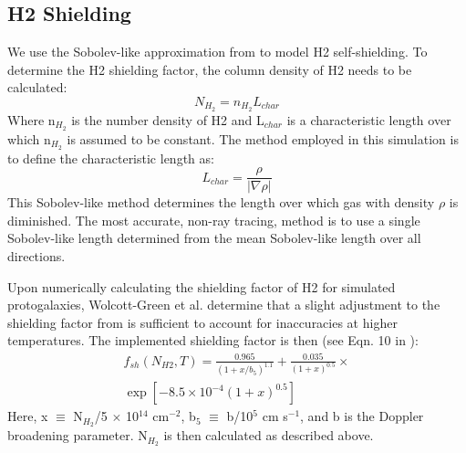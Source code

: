 \documentclass[a4paper,fleqn,usenatbib]{mnras}
\begin{document}
\subsection{H2 Shielding}
We use the Sobolev-like approximation from \citet{Wolcott11} to model H2 self-shielding. To determine the H2 shielding factor, the column density of H2 needs to be calculated:
\begin{equation}
	N_{H_{2}} = n_{H_{2}}L_{char}
\end{equation}
Where n$_{H_{2}}$ is the number density of H2 and L$_{char}$ is a characteristic length over which n$_{H_{2}}$ is assumed to be constant. The method employed in this simulation is to define the characteristic length as:
\begin{equation}
	L_{char} = \frac{\rho}{|\nabla \rho|}
\end{equation}
This Sobolev-like method determines the length over which gas with density $\rho$ is diminished. The most accurate, non-ray tracing, method is to use a single Sobolev-like length determined from the mean Sobolev-like length over all directions. 

Upon numerically calculating the shielding factor of H2 for simulated protogalaxies, Wolcott-Green et al. determine that a slight adjustment to the shielding factor from \citet{Draine96} is sufficient to account for inaccuracies at higher temperatures. The implemented shielding factor is then (see Eqn. 10 in \citet{Wolcott11}):
\begin{equation}
	\begin{multlined}
	f_{sh}(N_{H2}, T) = \frac{0.965}{(1+x/b_{5})^{1.1}} + \frac{0.035}{(1+x)^{0.5}}  \times \\ \exp [-8.5 \times 10^{-4} (1+x)^{0.5}]
	\end{multlined}
\end{equation}
Here, x $\equiv$ N$_{H_{2}}$/5 $\times$ 10$^{14}$ cm$^{-2}$, b$_{5}$ $\equiv$ b/10$^{5}$ cm s$^{-1}$, and b is the Doppler broadening parameter. N$_{H_{2}}$ is then calculated as described above.


\end{document}
